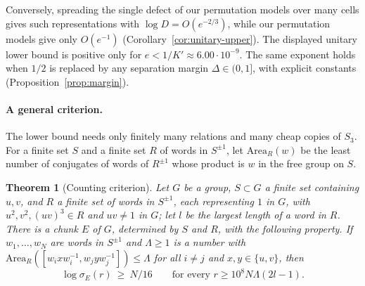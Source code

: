 \documentclass[11pt,a4paper]{article}
\theoremstyle{plain}
\newtheorem{theorem}{Theorem}[section]
\theoremstyle{definition}
\theoremstyle{remark}
\begin{document}
Conversely, spreading the single defect of our permutation models over many cells gives such representations with $\log D=O(e^{-2/3})$,
while our permutation models give only $O(e^{-1})$ (Corollary~\ref{cor:unitary-upper}).
The displayed unitary lower bound is positive only for $e<1/K'\approx6.00\cdot10^{-9}$. The same exponent holds when $1/2$ is replaced
by any separation margin $\Delta\in(0,1]$, with explicit constants (Proposition~\ref{prop:margin}).

\paragraph{A general criterion.} The lower bound needs only finitely many relations and many cheap copies of $S_3$. For a finite set $S$
and a finite set $R$ of words in $S^{\pm1}$, let $\mathrm{Area}_R(w)$ be the least number of conjugates of words of $R^{\pm1}$ whose product is
$w$ in the free group on $S$.

\begin{theorem}[Counting criterion]\label{thm:criterion-intro}
Let $G$ be a group, $S\subset G$ a finite set containing $u,v$, and $R$ a finite set of words in $S^{\pm1}$, each representing $1$ in $G$,
with $u^2,v^2,(uv)^3\in R$ and $uv\ne1$ in $G$; let $l$ be the largest length of a word in $R$. There is a chunk $E$ of $G$, determined by
$S$ and $R$, with the following property. If $w_1,\dots,w_N$ are words in $S^{\pm1}$ and $\Lambda\ge1$ is a number with
$\mathrm{Area}_R([w_ixw_i^{-1},w_jyw_j^{-1}])\le\Lambda$ for all $i\ne j$ and $x,y\in\{u,v\}$, then
\[
\log\sigma_E(r)\ \ge\ N/16\qquad\text{for every }r\ge10^8N\Lambda(2l-1).
\]
\end{theorem}
\end{document}
